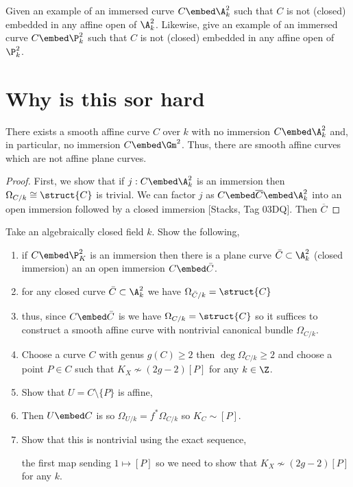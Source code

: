 \documentclass[12pt]{article}
\begin{document}
\begin{exercise}
Given an example of an immersed curve $C \embed \A^2_k$ such that $C$ is not (closed) embedded in any affine open of $\A^2_k$. Likewise, give an example of an immersed curve $C \embed \P^2_k$ such that $C$ is not (closed) embedded in any affine open of $\P^2_k$.
\end{exercise}

\section{Why is this sor hard}


\begin{prop}
There exists a smooth affine curve $C$ over $k$ with no immersion $C \embed \A^2_k$ and, in particular, no immersion $C \embed \Gm^2$. Thus, there are smooth affine curves which are not affine plane curves. 
\end{prop}

\begin{proof}
First, we show that if $j : C \embed \A^2_k$ is an immersion then $\Omega_{C/k} \cong \struct{C}$ is trivial. We can factor $j$ as $C \embed \overline{C} \embed \A^2_k$ into an open immersion followed by a closed immersion [Stacks, Tag 03DQ]. Then $\overline{C}$ 
\end{proof}

Take an algebraically closed field $k$. Show the following,
\begin{enumerate}
\item if $C \embed \P^2_K$ is an immersion then there is a plane curve $\bar{C} \subset \A^2_k$ (closed immersion) an an open immersion $C \embed \bar{C}$.
\item for any closed curve $\bar{C} \subset \A^2_k$ we have $\Omega_{\bar{C}/k} = \struct{C}$
\item thus, since $C \embed \bar{C}$ is \etale we have $\Omega_{C/k} = \struct{C}$ so it suffices to construct a smooth affine curve with nontrivial canonical bundle $\Omega_{C/k}$.
\item Choose a curve $C$ with genus $g(C) \ge 2$ then $\deg{\Omega_{C/k}} \ge 2$ and choose a point $P \in C$ such that $K_X \not\sim (2g - 2) [P]$ for any $k \in \Z$.
\item Show that $U = C \setminus \{ P \}$ is affine,
\item Then $U \embed C$ is \etale so $\Omega_{U / k} = f^* \Omega_{C/k}$ so $K_C \sim [P]$. 
\item Show that this is nontrivial using the exact sequence,
\begin{center}
\end{center}
the first map sending $1 \mapsto [P]$ so we need to show that $K_X \not\sim (2g - 2) [P]$ for any $k$. 
\end{enumerate}
\end{document}
